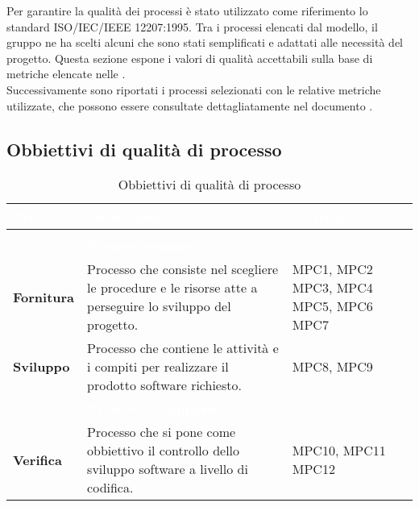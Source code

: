 
Per garantire la qualità dei processi è stato utilizzato come riferimento lo standard ISO/IEC/IEEE 12207:1995. Tra i processi elencati dal modello, il gruppo ne ha scelti alcuni che sono stati semplificati e adattati alle necessità del progetto. Questa sezione espone i valori di qualità accettabili sulla base di metriche elencate nelle \NdPv{}.\\ Successivamente sono riportati i processi selezionati con le relative metriche utilizzate, che possono essere consultate dettagliatamente nel documento .

\subsection{Obbiettivi di qualità di processo}
{
\setlength\arrayrulewidth{0.95pt}
\renewcommand{\arraystretch}{1.5}
\begin{longtable}{C{3cm} | C{9.5cm} | C{2.5cm}}

\textcolor{white}{\textbf{Processo}}&
\textcolor{white}{\textbf{Descrizione}}&
\textcolor{white}{\textbf{Metriche}} \\
\endfirsthead
{}\\
\endfoot
{}\caption{Obbiettivi di qualità di processo}
\endlastfoot
	
 & \textcolor{white}{\textbf{Processi primari}} &  \\

	\textbf{Fornitura} &
	 Processo che consiste nel scegliere le procedure e le risorse atte a perseguire lo sviluppo del progetto. &
	MPC1, MPC2 \newline MPC3, MPC4 \newline MPC5, MPC6 \newline MPC7  \\
	
		\textbf{Sviluppo} &
	 Processo che contiene le attività e i compiti per realizzare il prodotto software richiesto. &
	MPC8, MPC9 \\
 
 & \textcolor{white}{\textbf{Processi di supporto}} &  \\
 
	\textbf{Verifica} & 
	Processo che si pone come obbiettivo il controllo dello sviluppo software a livello di codifica. &
	MPC10, MPC11 \newline MPC12 \\
	

\end{longtable}}
